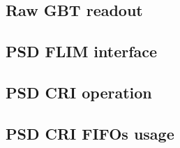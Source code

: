 \documentclass{article}
\begin{document}
\subsection{Raw GBT readout}




\subsection{PSD FLIM interface}





\subsection{PSD CRI operation}








\subsection{PSD CRI FIFOs usage}
\end{document}
